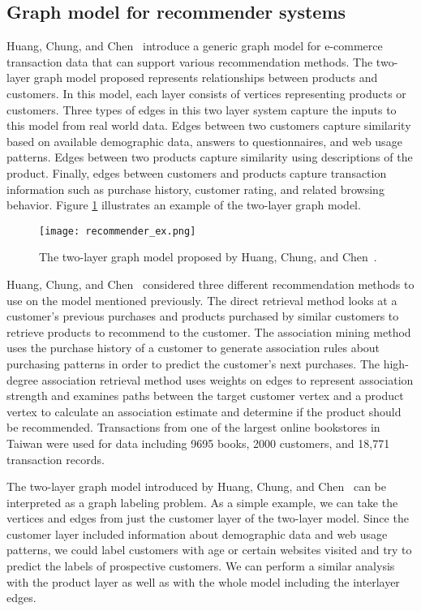 \subsection{Graph model for recommender systems}
Huang, Chung, and Chen~\cite{huang2004graph} introduce a generic graph model for e-commerce transaction data that can support various recommendation methods. The two-layer graph model proposed represents relationships between products and customers. In this model, each layer consists of vertices representing products or customers. Three types of edges in this two layer system capture the inputs to this model from real world data. Edges between two customers capture similarity based on available demographic data, answers to questionnaires, and web usage patterns. Edges between two products capture similarity using descriptions of the product. Finally, edges between customers and products capture transaction information such as purchase history, customer rating, and related browsing behavior. Figure \ref{fig:recommender_example} illustrates an example of the two-layer graph model.

\begin{figure}[h]
\centering
\texttt{[image: recommender\_ex.png]}
\caption{The two-layer graph model proposed by Huang, Chung, and Chen~\cite{huang2004graph}.}
\label{fig:recommender_example}
\end{figure}

Huang, Chung, and Chen~\cite{huang2004graph} considered three different recommendation methods to use on the model mentioned previously. The direct retrieval method looks at a customer's previous purchases and products purchased by similar customers to retrieve products to recommend to the customer. The association mining method uses the purchase history of a customer to generate association rules about purchasing patterns in order to predict the customer's next purchases. The high-degree association retrieval method uses weights on edges to represent association strength and examines paths between the target customer vertex and a product vertex to calculate an association estimate and determine if the product should be recommended. Transactions from one of the largest online bookstores in Taiwan were used for data including 9695 books, 2000 customers, and 18,771 transaction records.

The two-layer graph model introduced by Huang, Chung, and Chen~\cite{huang2004graph} can be interpreted as a graph labeling problem. As a simple example, we can take the vertices and edges from just the customer layer of the two-layer model. Since the customer layer included information  about demographic data and web usage patterns, we could label customers with age or certain websites visited and try to predict the labels of prospective customers. We can perform a similar analysis with the product layer as well as with the whole model including the interlayer edges.

